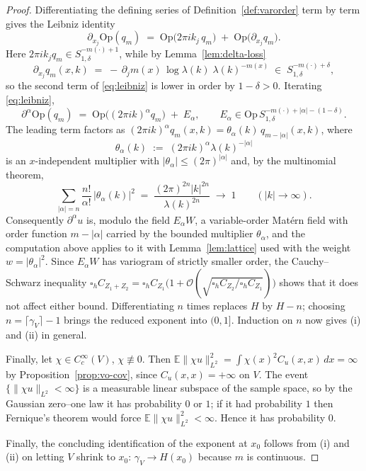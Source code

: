 \documentclass[pdflatex,sn-mathphys,Numbered]{sn-jnl}
\theoremstyle{thmstyleone}%
\theoremstyle{thmstyletwo}%
\theoremstyle{thmstylethree}%
\newcommand{\calO}{\mathcal{O}}
\newcommand{\Op}{\mathrm{Op}}
\newcommand{\E}{\mathbb{E}}
\begin{document}
\begin{proof}
Differentiating the defining series of
Definition~\ref{def:varorder} term by term gives the Leibniz
identity
\begin{equation}\label{eq:leibniz}
    \partial_{x_j}\Op(q_m) \;=\; \Op\bigl(2\pi i k_j\, q_m\bigr)
        \;+\; \Op\bigl(\partial_{x_j} q_m\bigr) .
\end{equation}
Here
$2\pi ik_j q_m \in S^{-m(\cdot)+1}_{1,\delta}$, while by
Lemma~\ref{lem:delta-loss}
\[
    \partial_{x_j} q_m(x,k) \;=\; -\,\partial_j m(x)\,\log\lambda(k)\;
    \lambda(k)^{-m(x)} \;\in\; S^{-m(\cdot)+\delta}_{1,\delta} ,
\]
so the second term of \eqref{eq:leibniz} is lower in order by $1-\delta>0$.
Iterating \eqref{eq:leibniz},
\begin{equation}\label{eq:leibniz-iterated}
    \partial^\alpha \Op(q_m) \;=\; \Op\bigl((2\pi i k)^{\alpha} q_m\bigr)
        \;+\; E_\alpha , \qquad
    E_\alpha \in \Op\,S^{-m(\cdot)+|\alpha|-(1-\delta)}_{1,\delta} .
\end{equation}
The leading term factors as
$(2\pi i k)^{\alpha}q_m(x,k) = \theta_\alpha(k)\,q_{m-|\alpha|}(x,k)$, where
\begin{equation}\label{eq:theta}
    \theta_\alpha(k) \;:=\; (2\pi i k)^{\alpha}\lambda(k)^{-|\alpha|}
\end{equation}
is an $x$-independent multiplier with $|\theta_\alpha| \leq (2\pi)^{|\alpha|}$
and, by the multinomial theorem,
\begin{equation}\label{eq:theta-sum}
    \sum_{|\alpha|=n}\frac{n!}{\alpha!}\,|\theta_\alpha(k)|^2
    \;=\; \frac{(2\pi)^{2n}|k|^{2n}}{\lambda(k)^{2n}} \;\longrightarrow\; 1
    \qquad (|k|\to\infty) .
\end{equation}
Consequently $\partial^\alpha u$ is, modulo the field $E_\alpha W$, a
variable-order Mat\'ern field with order function $m-|\alpha|$ carried by the
bounded multiplier $\theta_\alpha$, and the computation above applies to it with
Lemma~\ref{lem:lattice} used with the weight $w=|\theta_\alpha|^2$. Since
$E_\alpha W$ has variogram of strictly smaller order, the Cauchy--Schwarz inequality
$\square_h C_{Z_1+Z_2} = \square_h C_{Z_1}\bigl(1+\calO(\sqrt{\square_h
C_{Z_2}/\square_h C_{Z_1}})\bigr)$ shows that it does not affect either bound.
Differentiating $n$ times replaces $H$ by $H-n$; choosing
$n = \lceil\gamma_V\rceil-1$ brings the reduced exponent into $(0,1]$. Induction on $n$ now gives (i) and (ii) in general.

Finally, let $\chi\in C_c^\infty(V)$, $\chi\not\equiv0$. Then
$\E\|\chi u\|_{L^2}^2 = \int \chi(x)^2 C_u(x,x)\,dx = \infty$ by
Proposition~\ref{prop:vo-cov}, since $C_u(x,x)=+\infty$ on $V$. The event
$\{\|\chi u\|_{L^2}<\infty\}$ is a measurable linear subspace of the sample
space, so by the Gaussian zero--one law \cite{kallianpur} it has probability $0$
or $1$; if it had probability $1$ then Fernique's theorem \cite{fernique} would
force $\E\|\chi u\|_{L^2}^2<\infty$. Hence it has probability $0$.

Finally, the concluding identification of the exponent at $x_0$ follows from (i)
and (ii) on letting $V$ shrink to $x_0$: $\gamma_V \to H(x_0)$ because $m$ is
continuous.
\end{proof}
\end{document}
